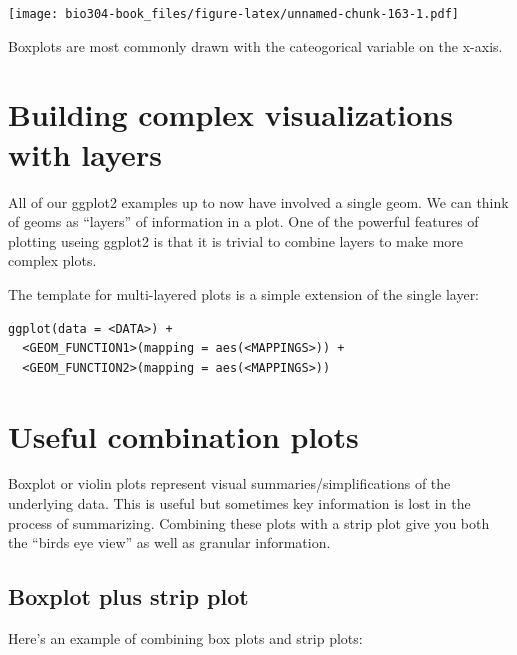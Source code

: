 \documentclass[]{book}
\theoremstyle{definition}
\theoremstyle{definition}
\theoremstyle{definition}
\theoremstyle{remark}
\begin{document}
\texttt{[image: bio304-book\_files/figure-latex/unnamed-chunk-163-1.pdf]}

Boxplots are most commonly drawn with the cateogorical variable on the
x-axis.

\hypertarget{building-complex-visualizations-with-layers}{%
\section{Building complex visualizations with
layers}\label{building-complex-visualizations-with-layers}}

All of our ggplot2 examples up to now have involved a single geom. We
can think of geoms as ``layers'' of information in a plot. One of the
powerful features of plotting useing ggplot2 is that it is trivial to
combine layers to make more complex plots.

The template for multi-layered plots is a simple extension of the single
layer:

\begin{verbatim}
ggplot(data = <DATA>) + 
  <GEOM_FUNCTION1>(mapping = aes(<MAPPINGS>)) + 
  <GEOM_FUNCTION2>(mapping = aes(<MAPPINGS>)) 
\end{verbatim}

\hypertarget{useful-combination-plots}{%
\section{Useful combination plots}\label{useful-combination-plots}}

Boxplot or violin plots represent visual summaries/simplifications of
the underlying data. This is useful but sometimes key information is
lost in the process of summarizing. Combining these plots with a strip
plot give you both the ``birds eye view'' as well as granular
information.

\hypertarget{boxplot-plus-strip-plot}{%
\subsection{Boxplot plus strip plot}\label{boxplot-plus-strip-plot}}

Here's an example of combining box plots and strip plots:
\end{document}

